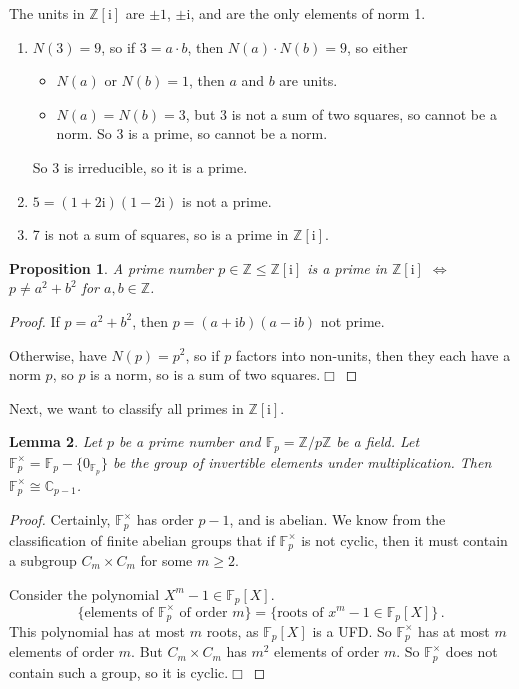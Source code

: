 \documentclass{article}
\theoremstyle{plain}\theoremheaderfont{\normalfont\itshape}\theorembodyfont{\rmfamily}\theoremseparator{.}\newtheorem*{rem}{Remark}\newtheorem*{ex}{Example}\newtheorem*{proof}{Proof}\newtheorem*{altp}{Alternative proof}\newtheorem*{nonex}{Non-Example}
\theoremstyle{plain}\theoremheaderfont{\normalfont\bfseries}\theorembodyfont{\rmfamily}\theoremseparator{.}\newtheorem{thm}{Theorem}[section]\newtheorem{lem}[thm]{Lemma}\newtheorem{prop}[thm]{Proposition}\newtheorem*{cor}{Corollary}\newtheorem{defn}[thm]{Definition}\newtheorem{clm}[thm]{Claim}\newtheorem{clminproof}{Claim}\newtheorem*{notn}{Notation}\newtheorem*{exer}{Exercise}\newtheorem*{lemnn}{Lemma}
\theoremstyle{break}\theoremheaderfont{\normalfont\itshape}\theorembodyfont{\rmfamily}\theoremseparator{.\medskip}\newtheorem*{proofskip}{Proof}\newtheorem*{exs}{Examples}\newtheorem*{rems}{Remarks}\newtheorem*{obs}{Observations}
\theoremstyle{break}\theoremheaderfont{\normalfont\bfseries}\theorembodyfont{\rmfamily}\theoremseparator{.\medskip}\newtheorem{lemskip}[thm]{Lemma}\newtheorem{defnskip}[thm]{Definition}\newtheorem{propskip}[thm]{Proposition}\newtheorem{thmskip}[thm]{Theorem}
\numberwithin{equation}{section}
\newcommand{\qed}{\hfill\ensuremath{\Box}}
\newcommand{\ii}{\mathrm{i}}
\newcommand{\ZZ}{\mathbb{Z}}
\newcommand{\CC}{\mathbb{C}}
\newcommand{\FF}{\mathbb{F}}
\begin{document}
    The units in \(\ZZ[\ii]\) are \(\pm 1\), \(\pm \ii\), and are the only elements of norm 1.
    \begin{enumerate}[topsep=0pt,label=(\roman*)]
        \item \(N(3)=9\), so if \(3=a\cdot b\), then \(N(a)\cdot N(b)=9\), so either
        \begin{itemize}[topsep=0pt]
            \item \(N(a)\) or \(N(b)=1\), then \(a\) and \(b\) are units.
            \item \(N(a)=N(b)=3\), but \(3\) is not a sum of two squares, so cannot be a norm. So 3 is a prime, so cannot be a norm.
        \end{itemize}
        So 3 is irreducible, so it is a prime.
        \item \(5=(1+2\ii)(1-2\ii)\) is not a prime.
        \item 7 is not a sum of squares, so is a prime in \(\ZZ[\ii]\).
    \end{enumerate}
    \begin{prop}
        A prime number \(p\in\ZZ\le\ZZ[\ii]\) is a prime in \(\ZZ[\ii]\) \(\iff\) \(p\ne a^2+b^2\) for \(a,b\in\ZZ\).
    \end{prop}
    \begin{proof}
        If \(p=a^2+b^2\), then \(p=(a+\ii b)(a-\ii b)\) not prime.

        Otherwise, have \(N(p)=p^2\), so if \(p\) factors into non-units, then they each have a norm \(p\), so \(p\) is a norm, so is a sum of two squares.\qed
    \end{proof}
    Next, we want to classify all primes in \(\ZZ[\ii]\).
    \begin{lem}
        Let \(p\) be a prime number and \(\FF_p=\ZZ/p\ZZ\) be a field. Let \(\FF_p^\times=\FF_p-\{0_{\FF_p}\}\) be the group of invertible elements under multiplication. Then \(\FF_p^\times\cong\CC_{p-1}\).
    \end{lem}
    \begin{proof}
        Certainly, \(\FF_p^\times\) has order \(p-1\), and is abelian. We know from the classification of finite abelian groups that if \(\FF_p^\times\) is not cyclic, then it must contain a subgroup \(C_m\times C_m\) for some \(m\ge 2\).

        Consider the polynomial \(X^m-1\in\FF_p[X]\).
        \[\{\text{elements of \(\FF_p^\times\) of order \(m\)}\}=\{\text{roots of \(x^m-1\in\FF_p[X]\)}\}\,.\]
        This polynomial has at most \(m\) roots, as \(\FF_p[X]\) is a UFD. So \(\FF_p^\times\) has at most \(m\) elements of order \(m\). But \(C_m\times C_m\) has \(m^2\) elements of order \(m\). So \(\FF_p^\times\) does not contain such a group, so it is cyclic.\qed
    \end{proof}
\end{document}
